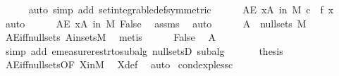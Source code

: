 \begin{isabellebody}
\ \ \ \ \isamarkupfalse%
\ {\isacharparenleft}{\kern0pt}auto\ simp\ add{\isacharcolon}{\kern0pt}\ set{\isacharunderscore}{\kern0pt}integrable{\isacharunderscore}{\kern0pt}def{\isacharbrackleft}{\kern0pt}symmetric{\isacharbrackright}{\kern0pt}{\isacharparenright}{\kern0pt}\isanewline
\ \ \ \ \isamarkupfalse%
\ {\isachardoublequoteopen}AE\ x{\isasymin}A\ in\ M{\isachardot}{\kern0pt}\ c\ {\isacharequal}{\kern0pt}\ f\ x{\isachardoublequoteclose}\ \isamarkupfalse%
\ auto\isanewline
\ \ \ \ \isamarkupfalse%
\ {\isachardoublequoteopen}AE\ x{\isasymin}A\ in\ M{\isachardot}{\kern0pt}\ False{\isachardoublequoteclose}\ \isamarkupfalse%
\ assms{\isacharparenleft}{\kern0pt}{}{\isacharparenright}{\kern0pt}\ \isamarkupfalse%
\ auto\isanewline
\ \ \ \ \isamarkupfalse%
\ {\isachardoublequoteopen}A\ {\isasymin}\ null{\isacharunderscore}{\kern0pt}sets\ M{\isachardoublequoteclose}\ \isamarkupfalse%
\ AE{\isacharunderscore}{\kern0pt}iff{\isacharunderscore}{\kern0pt}null{\isacharunderscore}{\kern0pt}sets\ A{\isacharunderscore}{\kern0pt}in{\isacharunderscore}{\kern0pt}sets{\isacharunderscore}{\kern0pt}M\ \isamarkupfalse%
\ metis\isanewline
\ \ \ \ \isamarkupfalse%
\ False\ \isamarkupfalse%
\ A{\isacharparenleft}{\kern0pt}{}{\isacharparenright}{\kern0pt}\ \isamarkupfalse%
\ {\isacharparenleft}{\kern0pt}simp\ add{\isacharcolon}{\kern0pt}\ emeasure{\isacharunderscore}{\kern0pt}restr{\isacharunderscore}{\kern0pt}to{\isacharunderscore}{\kern0pt}subalg\ null{\isacharunderscore}{\kern0pt}setsD{}\ subalg{\isacharparenright}{\kern0pt}\isanewline
\ \ \isamarkupfalse%
\isanewline
\ \ \isamarkupfalse%
\ {\isacharquery}{\kern0pt}thesis\ \isamarkupfalse%
\ AE{\isacharunderscore}{\kern0pt}iff{\isacharunderscore}{\kern0pt}null{\isacharunderscore}{\kern0pt}sets{\isacharbrackleft}{\kern0pt}OF\ X{\isacharunderscore}{\kern0pt}in{\isacharunderscore}{\kern0pt}M{\isacharbrackright}{\kern0pt}\ \isamarkupfalse%
\ X{\isacharunderscore}{\kern0pt}def\ \isamarkupfalse%
\ auto\isanewline
{}\isamarkupfalse%
%
\endisatagproof
{\isafoldproof}%
%
\isadelimproof
\isanewline
%
\endisadelimproof
\isanewline
{}\isamarkupfalse%
\ cond{\isacharunderscore}{\kern0pt}exp{\isacharunderscore}{\kern0pt}less{\isacharunderscore}{\kern0pt}c{\isacharcolon}{\kern0pt}\isanewline

\end{isabellebody}
